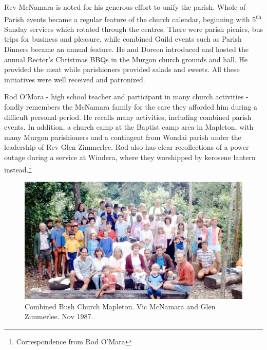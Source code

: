 Rev McNamara is noted for his generous effort to unify the parish. Whole-of Parish events became a regular feature of the church calendar, beginning with 5\textsuperscript{th} Sunday services which rotated through the centres. There were parish picnics, bus trips for business and pleasure, while combined Guild events such as Parish Dinners became an annual feature. He and Doreen introduced and hosted the annual Rector's Christmas BBQs in the Murgon church grounds and hall. He provided the meat while parishioners provided salads and sweets. All these initiatives were well received and patronized.



Rod O'Mara - high school teacher and participant in many church activities - fondly remembers the McNamara family for the care they afforded him during a difficult personal period. He recalls many activities, including combined parish events. In addition, a church camp at the Baptist camp area in Mapleton, with many Murgon parishioners and a contingent from Wondai parish under the leadership of Rev Glen Zimmerlee. Rod also has clear recollections of a power outage during a service at Windera, where they worshipped by kerosene lantern instead.\footnote{Correspondence from Rod O'Mara}








\begin{figure}[!htb]
\begin{center}
\includegraphics[width=1.\textwidth,center]{../images/bushChuchMapleton1987.jpg}
\caption{Combined Bush Church Mapleton. Vic McNamara and Glen Zimmerlee. Nov 1987.}
\end{center}
\end{figure}




